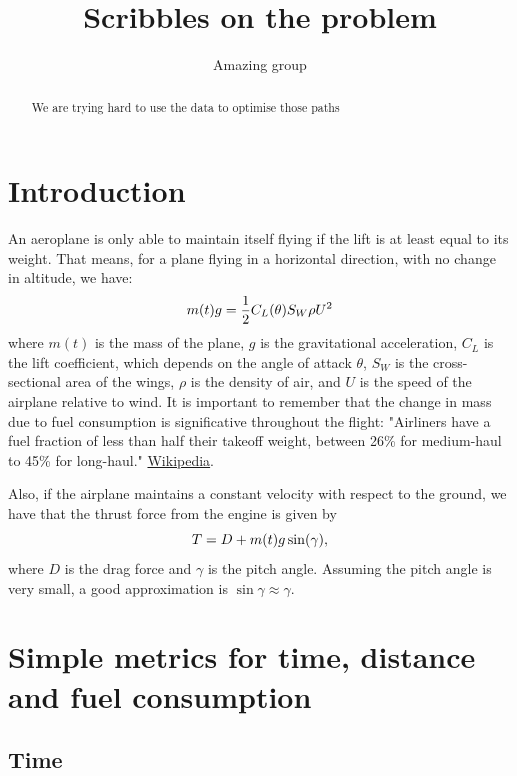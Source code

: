 \documentclass{article}
\title{Scribbles on the problem}
\author{Amazing group}
\begin{document}
\maketitle

\begin{abstract}
We are trying hard to use the data to optimise those paths
\end{abstract}

\section{Introduction}

An aeroplane is only able to maintain itself flying if the lift is at least equal to its weight. That means, for a plane flying in a horizontal direction, with no change in altitude, we have:
%
\begin{equation}
    \notag
    m(t) g = \frac{1}{2} C_L(\theta) S_{W} \rho U^2
\end{equation}
%
where $m(t)$ is the mass of the plane, $g$ is the gravitational acceleration, $C_L$ is the lift coefficient, which depends on the angle of attack $\theta$, $S_W$ is the cross-sectional area of the wings, $\rho$ is the density of air, and $U$ is the speed of the airplane relative to wind. It is important to remember that the change in mass due to fuel consumption is significative throughout the flight: "Airliners have a fuel fraction of less than half their takeoff weight, between 26\% for medium-haul to 45\% for long-haul." \href{https://en.wikipedia.org/wiki/Fuel_fraction}{Wikipedia}. 

Also, if the airplane maintains a constant velocity with respect to the ground, we have that the thrust force from the engine is given by
%
\begin{equation}
    \notag
    T = D + m(t)g \sin(\gamma),
\end{equation}
%
where $D$ is the drag force and $\gamma$ is the pitch angle. Assuming the pitch angle is very small, a good approximation is $\sin{\gamma} \approx \gamma$.

\section{Simple metrics for time, distance and fuel consumption}

\subsection{Time}
\end{document}
